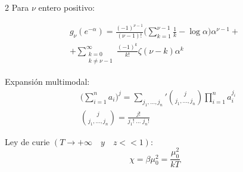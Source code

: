 \documentclass[a4, 12pt]{article}
\begin{document}
\begin{multicols}{2}
    Para $\nu$ entero positivo:

    \begin{equation*}
      \begin{aligned}
        g_{\nu}(e^{-\alpha}) = \frac{(-1)^{\nu-1}}{(\nu - 1)!}\bigg(\sum_{k=1}^{\nu-1}\frac{1}{k} - \log\alpha\bigg)\alpha^{\nu-1} + \\
        + \sum_{\substack{k=0  \\ k \neq \nu-1}}^{\infty}\frac{(-1)^k}{k!}\zeta(\nu - k) \alpha^{k}
      \end{aligned}
    \end{equation*}

    Expansión multimodal:
    \begin{equation*}
      \begin{aligned}
        &\bigg(\sum_{i=1}^{n}a_{i}\bigg)^{j} = \sum_{j_{1},...,j_{n}}' \binom{j}{j_{1},...,j_{n}} \prod_{i=1}^{n}a_{i}^{j_{i}} \\
        &\binom{j}{j_{1},...,j_{n}} = \frac{j!}{j_{1}!\;...\;j_{n}!}
      \end{aligned}
    \end{equation*}

    Ley de curie $(T\rightarrow+\infty \quad y \quad z << 1)$:
    \begin{equation*}
      \chi = \beta \mu_0^2 = \frac{\mu_0^2}{kT}
    \end{equation*}

\end{multicols}
\end{document}
